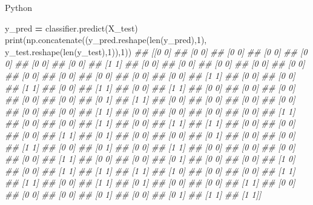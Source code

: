 \documentclass[
]{book}
\newenvironment{Shaded}{\begin{snugshade}}{\end{snugshade}}
\newcommand{\BuiltInTok}[1]{#1}
\newcommand{\CommentTok}[1]{\textcolor[rgb]{0.56,0.35,0.01}{\textit{#1}}}
\newcommand{\DecValTok}[1]{\textcolor[rgb]{0.00,0.00,0.81}{#1}}
\newcommand{\NormalTok}[1]{#1}
\newcommand{\OperatorTok}[1]{\textcolor[rgb]{0.81,0.36,0.00}{\textbf{#1}}}
\theoremstyle{definition}
\theoremstyle{definition}
\theoremstyle{definition}
\theoremstyle{definition}
\theoremstyle{remark}
\begin{document}
Python

\begin{Shaded}
\begin{Highlighting}[]
\NormalTok{y\_pred }\OperatorTok{=}\NormalTok{ classifier.predict(X\_test)}
\BuiltInTok{print}\NormalTok{(np.concatenate((y\_pred.reshape(}\BuiltInTok{len}\NormalTok{(y\_pred),}\DecValTok{1}\NormalTok{), y\_test.reshape(}\BuiltInTok{len}\NormalTok{(y\_test),}\DecValTok{1}\NormalTok{)),}\DecValTok{1}\NormalTok{))}
\CommentTok{\#\# [[0 0]}
\CommentTok{\#\#  [0 0]}
\CommentTok{\#\#  [0 0]}
\CommentTok{\#\#  [0 0]}
\CommentTok{\#\#  [0 0]}
\CommentTok{\#\#  [0 0]}
\CommentTok{\#\#  [0 0]}
\CommentTok{\#\#  [1 1]}
\CommentTok{\#\#  [0 0]}
\CommentTok{\#\#  [0 0]}
\CommentTok{\#\#  [0 0]}
\CommentTok{\#\#  [0 0]}
\CommentTok{\#\#  [0 0]}
\CommentTok{\#\#  [0 0]}
\CommentTok{\#\#  [0 0]}
\CommentTok{\#\#  [0 0]}
\CommentTok{\#\#  [0 0]}
\CommentTok{\#\#  [0 0]}
\CommentTok{\#\#  [1 1]}
\CommentTok{\#\#  [0 0]}
\CommentTok{\#\#  [0 0]}
\CommentTok{\#\#  [1 1]}
\CommentTok{\#\#  [0 0]}
\CommentTok{\#\#  [1 1]}
\CommentTok{\#\#  [0 0]}
\CommentTok{\#\#  [1 1]}
\CommentTok{\#\#  [0 0]}
\CommentTok{\#\#  [0 0]}
\CommentTok{\#\#  [0 0]}
\CommentTok{\#\#  [0 0]}
\CommentTok{\#\#  [0 0]}
\CommentTok{\#\#  [0 1]}
\CommentTok{\#\#  [1 1]}
\CommentTok{\#\#  [0 0]}
\CommentTok{\#\#  [0 0]}
\CommentTok{\#\#  [0 0]}
\CommentTok{\#\#  [0 0]}
\CommentTok{\#\#  [0 0]}
\CommentTok{\#\#  [0 0]}
\CommentTok{\#\#  [1 1]}
\CommentTok{\#\#  [0 0]}
\CommentTok{\#\#  [0 0]}
\CommentTok{\#\#  [0 0]}
\CommentTok{\#\#  [0 0]}
\CommentTok{\#\#  [1 1]}
\CommentTok{\#\#  [0 0]}
\CommentTok{\#\#  [0 0]}
\CommentTok{\#\#  [1 1]}
\CommentTok{\#\#  [0 0]}
\CommentTok{\#\#  [1 1]}
\CommentTok{\#\#  [1 1]}
\CommentTok{\#\#  [0 0]}
\CommentTok{\#\#  [0 0]}
\CommentTok{\#\#  [0 0]}
\CommentTok{\#\#  [1 1]}
\CommentTok{\#\#  [0 1]}
\CommentTok{\#\#  [0 0]}
\CommentTok{\#\#  [0 0]}
\CommentTok{\#\#  [0 1]}
\CommentTok{\#\#  [0 0]}
\CommentTok{\#\#  [0 0]}
\CommentTok{\#\#  [1 1]}
\CommentTok{\#\#  [0 0]}
\CommentTok{\#\#  [0 1]}
\CommentTok{\#\#  [0 0]}
\CommentTok{\#\#  [1 1]}
\CommentTok{\#\#  [0 0]}
\CommentTok{\#\#  [0 0]}
\CommentTok{\#\#  [0 0]}
\CommentTok{\#\#  [0 0]}
\CommentTok{\#\#  [1 1]}
\CommentTok{\#\#  [0 0]}
\CommentTok{\#\#  [0 0]}
\CommentTok{\#\#  [0 1]}
\CommentTok{\#\#  [0 0]}
\CommentTok{\#\#  [0 0]}
\CommentTok{\#\#  [1 0]}
\CommentTok{\#\#  [0 0]}
\CommentTok{\#\#  [1 1]}
\CommentTok{\#\#  [1 1]}
\CommentTok{\#\#  [1 1]}
\CommentTok{\#\#  [1 0]}
\CommentTok{\#\#  [0 0]}
\CommentTok{\#\#  [0 0]}
\CommentTok{\#\#  [1 1]}
\CommentTok{\#\#  [1 1]}
\CommentTok{\#\#  [0 0]}
\CommentTok{\#\#  [1 1]}
\CommentTok{\#\#  [0 1]}
\CommentTok{\#\#  [0 0]}
\CommentTok{\#\#  [0 0]}
\CommentTok{\#\#  [1 1]}
\CommentTok{\#\#  [0 0]}
\CommentTok{\#\#  [0 0]}
\CommentTok{\#\#  [0 0]}
\CommentTok{\#\#  [0 1]}
\CommentTok{\#\#  [0 0]}
\CommentTok{\#\#  [0 1]}
\CommentTok{\#\#  [1 1]}
\CommentTok{\#\#  [1 1]]}
\end{Highlighting}
\end{Shaded}
\end{document}
